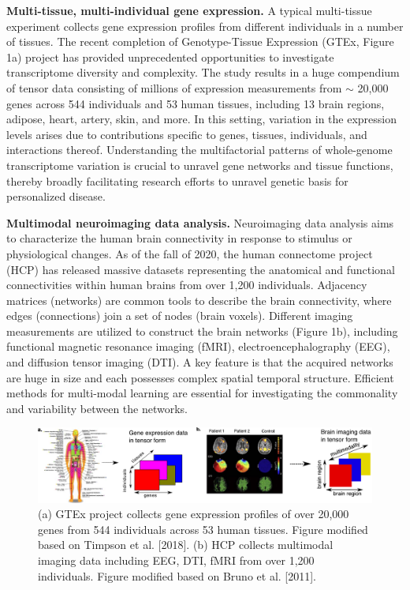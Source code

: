 \documentclass[10pt]{article}
\theoremstyle{definition}
\theoremstyle{definition}
\theoremstyle{definition}
\begin{document}
\begin{enumerate}
{\bf Multi-tissue, multi-individual gene expression.} A typical multi-tissue experiment collects gene expression profiles from different individuals in a number of tissues. The recent completion of Genotype-Tissue Expression (GTEx, Figure 1a) project has provided unprecedented opportunities to investigate transcriptome diversity and complexity. The study results in a huge compendium of tensor data consisting of millions of expression measurements from $\sim$ 20,000 genes across 544 individuals and 53 human tissues, including 13 brain regions, adipose, heart, artery, skin, and more. In this setting, variation in the expression levels arises due to contributions specific to genes, tissues, individuals, and interactions thereof. Understanding the multifactorial patterns of whole-genome transcriptome variation is crucial to unravel gene networks and tissue functions, thereby broadly facilitating research efforts to unravel genetic basis for personalized disease.

{\bf Multimodal neuroimaging data analysis.} Neuroimaging data analysis aims to characterize the human brain connectivity in response to stimulus or physiological changes. As of the fall of 2020, the human connectome project (HCP) has released massive datasets representing the anatomical and functional connectivities within human brains from over 1,200 individuals. Adjacency matrices (networks) are common tools to describe the brain connectivity, where edges (connections) join a set of nodes (brain voxels). Different imaging measurements are utilized to construct the brain networks (Figure 1b), including functional magnetic resonance imaging (fMRI), electroencephalography (EEG), and diffusion tensor imaging (DTI). A key feature is that the acquired networks are huge in size and each possesses complex spatial temporal structure. Efficient methods for multi-modal learning are essential for investigating the commonality and variability between the networks. 

\begin{figure}[H]
\begin{center}
\includegraphics[width=1\textwidth]{example.pdf}
\caption{\small (a) GTEx project collects gene expression profiles of over 20,000 genes from 544 individuals across 53 human tissues. Figure modified based on Timpson et al. [2018]. (b) HCP collects multimodal imaging data including EEG, DTI, fMRI from over 1,200 individuals. Figure modified based on Bruno et al. [2011].}
\end{center}
\end{figure} 


\end{enumerate}
\end{document}
